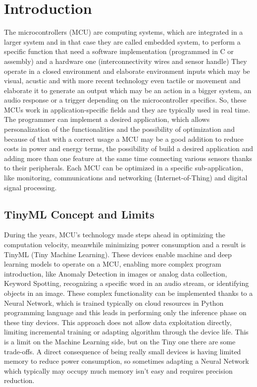 \chapter{Introduction}
\label{cha:intro}
The microcontrollers (MCU) are computing systems, which are integrated in a larger system and in that case they are called embedded system, to perform a specific function that need a software implementation (programmed in C or assembly) and a hardware one (interconnectivity wires and sensor handle)
They operate in a closed environment and elaborate environment inputs which may be visual, acustic and with more recent technology even tactile or movement and elaborate it to generate an output which may be an action in a bigger system, an audio response or a trigger depending on the microcontroller specifics. 
So, these MCUs work in application-specific fields and they are typically used in real time.
The programmer can implement a desired application, which allows personalization of the functionalities and the possibility of optimization and because of that with a correct usage a MCU may be a good addition to reduce costs in power and energy terms, the possibility of build a desired application and adding more than one feature at the same time connecting various sensors thanks to their peripherals.    
Each MCU can be optimized in a specific sub-application, like monitoring, communications and networking (Internet-of-Thing) and digital signal processing.
\section{TinyML Concept and Limits}
\label{sec:context}                                                                      
During the years, MCU's technology made steps ahead in optimizing the computation velocity, meanwhile minimizing power consumption and a result is TinyML (Tiny Machine Learning). These devices enable machine and deep learning models to operate on a MCU, enabling more complex program introduction, like Anomaly Detection in images or analog data collection, Keyword Spotting, recognizing a specific word in an audio stream, or identifying objects in an image.
These complex functionality can be implemented thanks to a Neural Network, which is trained typically on cloud resources in Python programming language and this leads in performing only the inference phase on these tiny devices. This approach does not allow data exploitation directly, limiting incremental training or adapting algorithm through the device life. This is a limit on the Machine Learning side, but on the Tiny one there are some trade-offs. A direct consequence of being really small devices is having limited memory to reduce power consumption, so sometimes adapting a Neural Network which typically may occupy much memory isn't easy and requires precision reduction. 
